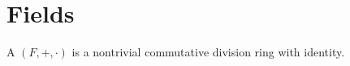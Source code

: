 \section{Fields}\label{sec:fields}

\begin{definition}\label{def:field}
  A  $(F, +, \cdot)$ is a nontrivial commutative division ring with identity.
\end{definition}
